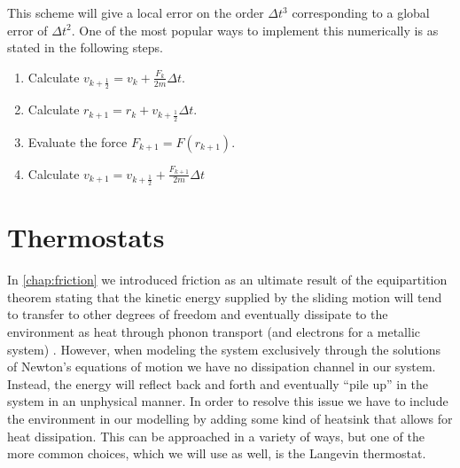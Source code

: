 This scheme will give a local error on the order $\Delta t^3$ corresponding to a
global error of $\Delta t^2$. One of the most popular ways to implement this
numerically is as stated in the following steps.
\begin{enumerate}
  \centering
  \item Calculate $v_{k+\frac{1}{2}} = v_k + \frac{F_k}{2m} \Delta t$.
  \item Calculate $r_{k+1} = r_k + v_{k+\frac{1}{2}} \Delta t$.
  \item Evaluate the force $F_{k+1} = F(r_{k+1})$.
  \item Calculate $v_{k+1} = v_{k+\frac{1}{2}} + \frac{F_{k+1}}{2m} \Delta t$  
\end{enumerate}


\section{Thermostats}\label{sec:thermostat}
In \cref{chap:friction} we introduced friction as an ultimate result of the equipartition theorem stating that the kinetic energy supplied by the sliding motion will tend to transfer to other degrees of freedom and eventually dissipate to the environment as heat through phonon transport (and electrons for a metallic system) \cite{Manini_2016}. However, when modeling the system exclusively through the solutions of Newton's equations of motion we have no dissipation channel in our system. Instead, the energy will reflect back and forth and eventually ``pile up'' in the system in an unphysical manner. In order to resolve this issue we have to include the environment in our modelling by adding some kind of heatsink that allows for heat dissipation. This can be approached in a variety of ways, but one of the more common choices, which we will use as well, is the Langevin thermostat.







